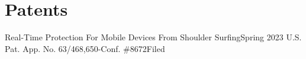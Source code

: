 \section{Patents}
  \CVSubHeadingListStart
    \CVSubheading
      {Real-Time Protection For Mobile Devices From Shoulder Surfing\cite{ShoulderSurfing}}{Spring 2023}
      {U.S. Pat. App. No. 63/468,650-Conf. \#8672}{Filed}
  \CVSubHeadingListEnd